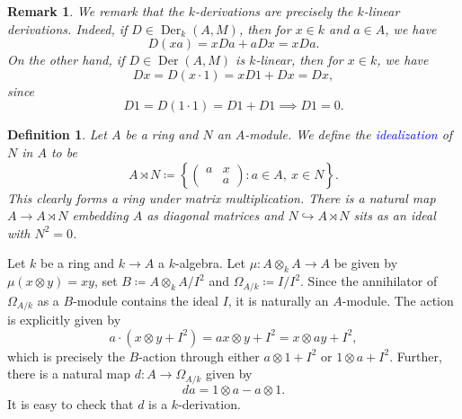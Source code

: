 \documentclass[10pt]{article}
\theoremstyle{thmstyle}
\theoremstyle{defstyle}
\newtheorem{definition}[theorem]{Definition}
\newtheorem{remark}[theorem]{Remark}
\newcommand{\into}{\hookrightarrow}
\newcommand{\define}[1]{\textcolor{blue}{\textit{#1}}}
\newcommand{\Der}{\operatorname{Der}}
\begin{document}
\begin{remark}
    We remark that the $k$-derivations are precisely the $k$-linear derivations. Indeed, if $D\in\Der_k(A, M)$, then for $x\in k$ and $a\in A$, we have 
    \begin{equation*}
        D(xa) = xDa + aDx = xDa.
    \end{equation*}
    On the other hand, if $D\in\Der(A, M)$ is $k$-linear, then for $x\in k$, we have 
    \begin{equation*}
        Dx = D(x\cdot 1) = xD1 + Dx = Dx,
    \end{equation*}
    since 
    \begin{equation*}
        D1 = D(1\cdot 1) = D1 + D1\implies D1 = 0.
    \end{equation*}
\end{remark}

\begin{definition}
    Let $A$ be a ring and $N$ an $A$-module. We define the \define{idealization} of $N$ in $A$ to be 
    \begin{equation*}
        A\rtimes N\coloneq\left\{\begin{pmatrix}
        a & x\\ & a
        \end{pmatrix}\colon a\in A,~x\in N\right\}.
    \end{equation*}
    This clearly forms a ring under matrix multiplication. There is a natural map $A\to A\rtimes N$ embedding $A$ as diagonal matrices and $N\into A\rtimes N$ sits as an ideal with $N^2 = 0$.
\end{definition}

Let $k$ be a ring and $k\to A$ a $k$-algebra. Let $\mu\colon A\otimes_k A\to A$ be given by $\mu(x\otimes y) = xy$, set $B\coloneq A\otimes_k A/I^2$ and $\Omega_{A/k}\coloneq I/I^2$. Since the annihilator of $\Omega_{A/k}$ as a $B$-module contains the ideal $I$, it is naturally an $A$-module. The action is explicitly given by 
\begin{equation*}
    a\cdot(x\otimes y + I^2) = ax\otimes y + I^2 = x\otimes ay + I^2,
\end{equation*}
which is precisely the $B$-action through either $a\otimes 1 + I^2$ or $1\otimes a + I^2$. Further, there is a natural map $d\colon A\to\Omega_{A/k}$ given by 
\begin{equation*}
    da = 1\otimes a - a\otimes 1.
\end{equation*}
It is easy to check that $d$ is a $k$-derivation. 
\end{document}

